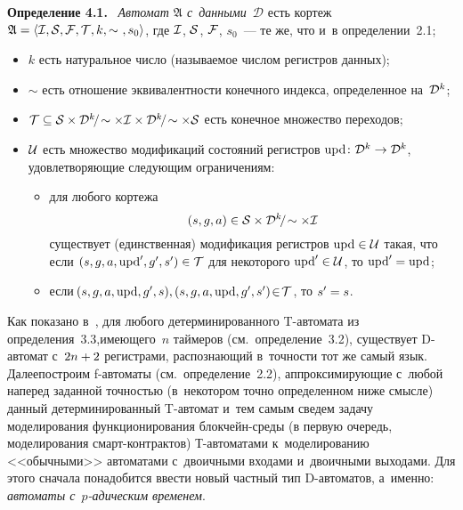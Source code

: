 \begin{multicols}{2}
\noindent
\textbf{Определение 4.1.}\
\textit{Автомат $\mathfrak A$ с~данными~$\mathcal D$} есть кортеж $\mathfrak A
\hm=\langle\Cal I,\Cal S,\Cal F,\Cal T,k,\sim~,s_0\rangle$, где 
$\mathcal I$, $\mathcal S$, $\mathcal F$, $s_0$~--- те же, что и~в определении~2.1;
\begin{itemize}
\item $k$ есть натуральное число  (называемое числом регистров данных);
\item $\sim$ есть отношение эквивалентности конечного индекса, определенное
на~$\mathcal D^k$;
\item $\mathcal T\subseteq \mathcal S\times\mathcal D^k\mathbin{\!/\!}\sim\times\mathcal I\times 
\mathcal D^k\mathbin{\!/\!}\sim\times\mathcal S$ есть конечное множество переходов;
\item $\mathcal U$ есть множество модификаций состояний регистров 
$\mathrm{upd}\colon \mathcal D^k\to\mathcal D^k$,
удовлетворяющие следующим ограничениям:
\begin{itemize}
\item для любого кортежа 
$$
(s,g,a)\in\mathcal S\times \mathcal D^k\mathbin{\!/\!}\sim\times \mathcal I
$$ 
существует (единственная) модификация регистров $\mathrm{upd}\hm\in\Cal U$
такая, что если
$(s,g,a,\mathrm{upd}^\prime,g^\prime,s^\prime)\hm\in\Cal T$ для
некоторого $\mathrm{upd}^\prime\in\mathcal U$, то $\mathrm{upd}^\prime\hm=\mathrm{upd}$;
\item если $\!(s,g,a,\mathrm{upd},g^\prime,s),
(s,g,a,\mathrm{upd},g^\prime,s^\prime)\hm\!\in\!\Cal T$, то $s^\prime\hm=s$.
\end{itemize}
\end{itemize}

Как показано в~\cite[теорема~13]{Bouyer-Algebraic-Time}, для любого детерминированного
T-автомата из определения~3.3,\linebreak имеющего~$n$ таймеров (см.\ определение~3.2), 
существует D-ав\-то\-мат с~$2n\hm+2$ регистрами, рас\-по\-зна\-ющий 
в~точ\-ности тот же самый язык. Далее\linebreak построим   f-ав\-то\-ма\-ты (см.\
 определение~2.2), аппроксимирующие с~любой наперед заданной точ\-ностью (в~некотором
точно определенном ниже смысле)  данный детерминированный T-ав\-то\-мат и~тем
самым сведем задачу моделирования функционирования блок\-чейн-сре\-ды (в первую
очередь, моделирования смарт-кон\-трак\-тов) Т-ав\-то\-ма\-та\-ми к~моделированию <<обычными>>
автоматами с~двоичными входами и~двоичными выходами. Для
этого сначала понадобится ввести новый частный тип D-ав\-то\-ма\-тов, а~именно: 
\textit{автоматы с~$p$-ади\-че\-ским временем}.



\end{multicols}

